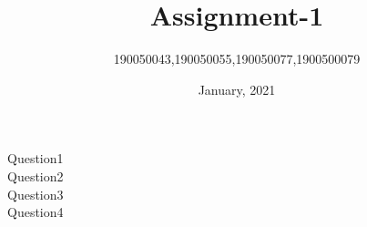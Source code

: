 \documentclass{article}
\theoremstyle{remark}
\begin{document}
\title{Assignment-1}
\author{190050043,190050055,190050077,1900500079}
\date{January, 2021}
\maketitle
\thispagestyle{empty}
\clearpage
{}



\LARGE{Question1}\\

\LARGE{Question2}\\


\LARGE{Question3}\\

\LARGE{Question4}\\
\end{document}
